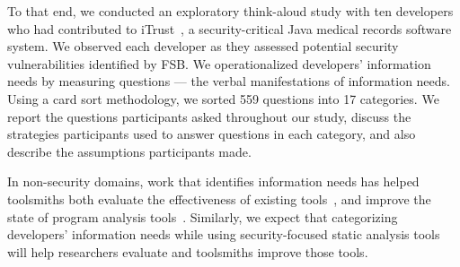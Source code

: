 \documentclass[10pt,journal,compsoc]{IEEEtran}
\begin{document}
To that end, we conducted an exploratory think-aloud study with ten developers who had contributed to iTrust~\cite{iTrust}, a security-critical Java medical records software system.
We observed each developer as they assessed potential security vulnerabilities identified by FSB. 
We operationalized developers' information needs by measuring questions --- the verbal manifestations of information needs.
Using a card sort methodology, we sorted 559 questions into 17 categories. 
We report the questions participants asked throughout our study, discuss the strategies participants used to answer questions in each category, and also describe the assumptions participants made.



In non-security domains, work that identifies information needs has helped toolsmiths both evaluate the effectiveness of existing tools~\cite{ammar2012empirical}, and improve the state of program analysis tools~\cite{kononenko2012automatically, servant2012history, yoon2013visualization}. 
Similarly, we expect that categorizing developers' information needs while using security-focused static analysis tools will help researchers evaluate and toolsmiths improve those tools. 







%
%
%
%
\end{document}

